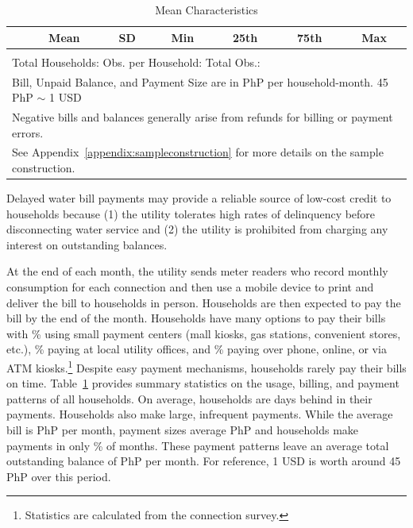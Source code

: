 \documentclass[12pt]{article}
\begin{document}
\begin{table}[h!] %
\centering
\caption{Mean Characteristics}\label{table:descriptives_all}
\vspace{-2mm}
\begin{tabular}{l*{1}{cccccc}}
\toprule
 & Mean & SD & Min & 25th & 75th & Max  \\
\midrule

\bottomrule \\ [-.8em]
\multicolumn{7}{l}{Total Households:   Obs. per Household:  Total Obs.: } \\
\multicolumn{7}{l}{\scriptsize Bill, Unpaid Balance, and Payment Size are in PhP per household-month.  45 PhP $\sim$ 1 USD} \\[-.5em]
\multicolumn{7}{l}{\scriptsize Negative bills and balances generally arise from refunds for billing or payment errors.}  \\[-.5em]
\multicolumn{7}{l}{\scriptsize See Appendix~\ref{appendix:sampleconstruction} for more details on the sample construction.} 
\end{tabular}
\end{table}

Delayed water bill payments may provide a reliable source of low-cost credit to households because (1) the utility tolerates high rates of delinquency before disconnecting water service and (2) the utility is prohibited from charging any interest on outstanding balances. 

At the end of each month, the utility sends meter readers who record monthly consumption for each connection and then use a mobile device to print and deliver the bill to households in person.  Households are then expected to pay the bill by the end of the month.  Households have many options to pay their bills with \unskip\% using small payment centers (mall kiosks, gas stations, convenient stores, etc.), \unskip\% paying at local utility offices, and \unskip\% paying over phone, online, or via ATM kiosks.\footnote{Statistics are calculated from the connection survey.}  Despite easy payment mechanisms, households rarely pay their bills on time.  Table~\ref{table:descriptives_all} provides summary statistics on the usage, billing, and payment patterns of all households.  On average, households are days behind in their payments.  Households also make large, infrequent payments.  While the average bill is PhP per month, payment sizes average PhP and households make payments in only \unskip\% of months.  These payment patterns leave an average total outstanding balance of PhP per month.  For reference, 1 USD is worth around 45 PhP over this period.
\end{document}
